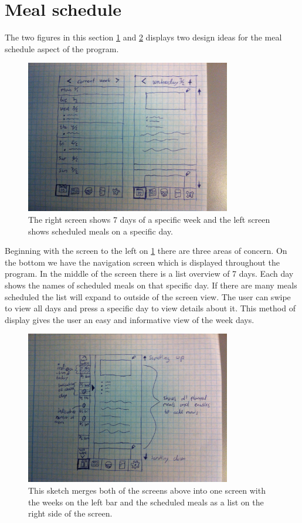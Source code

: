 \section{Meal schedule}

The two figures in this section \cref{MealScheduleList} and \cref{MealScheduleBar} displays two design ideas for the meal schedule aspect of the program.

\begin{figure}[H]
	\includegraphics[width=0.8\textwidth]{Grafik/FoodPlanner/FinalMealScheduleSketch1}
	\caption{The right screen shows 7 days of a specific week and the left screen shows scheduled meals on a specific day.}
	\label{MealScheduleList}
\end{figure}

Beginning with the screen to the left on \cref{MealScheduleList} there are three areas of concern. On the bottom we have the navigation screen which is displayed throughout the program. In the middle of the screen there is a list overview of 7 days. Each day shows the names of scheduled meals on that specific day. If there are many meals scheduled the list will expand to outside of the screen view. The user can swipe to view all days and press a specific day to view details about it. This method of display gives the user an easy and informative view of the week days. 

\begin{figure}[H]
	\includegraphics[width=0.8\textwidth]{Grafik/FoodPlanner/FinalMealScheduleSketch2}
	\caption{This sketch merges both of the screens above into one screen with the weeks on the left bar and the scheduled meals as a list on the right side of the screen.}
	\label{MealScheduleBar}
\end{figure}
